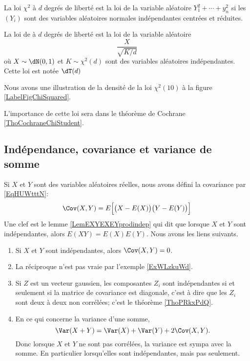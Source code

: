 \begin{definition}
    La loi \( \chi^2\) à \( d\) degrés de liberté est la loi de la variable aléatoire \( Y_1^2+\cdots+y_n^2\) si les \( (Y_i)\) sont des variables aléatoires normales indépendantes centrées et réduites.

    La loi de  à \( d\) degrés de liberté est la loi de la variable aléatoire
    \begin{equation}
        \frac{ X }{ \sqrt{K/d} }
    \end{equation}
    où \( X\sim\dN(0,1)\) et \( K\sim\chi^2(d)\) sont des variables aléatoires indépendantes. Cette loi est notée \( \dT(d)\)
\end{definition}

Nous avons une illustration de la densité de la loi \( \chi^2(10)\) à la figure \ref{LabelFigChiSquared}.
\newcommand{\CaptionFigChiSquared}{La densité de $\chi^2(10)$.}


L'importance de cette loi sera dans le théorème de Cochrane \ref{ThoCochraneChiStudent}.

\subsection{Indépendance, covariance et variance de somme}
\label{subsecTTHohur}

Si \( X\) et \( Y\) sont des variables aléatoires réelles, nous avons défini la covariance par \eqref{EqHUWtttN}:
\begin{equation}   
    \Cov(X,Y)=E\Big[ \big( X-E(X) \big)\big( Y-E(Y) \big) \Big]
\end{equation}
Une clef est le lemme \ref{LemEXYEXEYprodindep} qui dit que lorsque \( X\) et \( Y\) sont indépendantes, alors \( E(XY)=E(X)E(Y)\). Nous avons les liens suivants.
\begin{enumerate}
    \item
        Si \( X\) et \( Y\) sont indépendantes, alors \( \Cov(X,Y)=0\).
    \item
        La réciproque n'est pas vraie par l'exemple \ref{ExWLzkuWd}.
    \item
        Si \( Z\) est un vecteur gaussien, les composantes \( Z_i\) sont indépendantes si et seulement si la matrice de covariance est diagonale, c'est à dire que les \( Z_i\) sont deux à deux non corrélées; c'est le théorème \ref{ThoPRkxPdQ}.
    \item 
        En ce qui concerne la variance d'une somme,
        \begin{equation}
            \Var(X+Y)=\Var(X)+\Var(Y)+2\Cov(X,Y).
        \end{equation}
        Donc lorsque \( X\) et \( Y\) ne sont pas corrélées, la variance est sympa avec la somme. En particulier lorsqu'elles sont indépendantes, mais pas seulement.
\end{enumerate}

